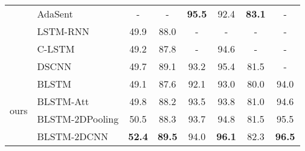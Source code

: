 \documentclass[11pt]{article}
\begin{document}
\begin{table*}[!t]
\begin{tabular}{c||l|c|c|c|c|c|c}
&AdaSent \cite{zhao2015self}    &-    &-    &\textbf{95.5}    &92.4    &\textbf{83.1}    &-\\
&LSTM-RNN \cite{le2015compositional}    &49.9    &88.0    &-    &-    &-   &-\\
&C-LSTM \cite{zhou2015c}    &49.2    &87.8    &-    &94.6    &-   &-\\
&DSCNN \cite{zhang2016dependency}    &49.7    &89.1    &93.2    &95.4    &81.5    &-\\
\hline
\multirow{4}{*}{ours}
&BLSTM    &49.1    &87.6    &92.1    &93.0    &80.0    &94.0\\
&BLSTM-Att    &49.8    &88.2    &93.5    &93.8    &81.0    &94.6\\
&BLSTM-2DPooling    &50.5    &88.3    &93.7    &94.8    &81.5    &95.5\\
&BLSTM-2DCNN    &\textbf{52.4}    &\textbf{89.5}    &94.0    &\textbf{96.1}   &82.3     &\textbf{96.5}\\
\hline




\end{tabular}
\end{table*}
\end{document}

